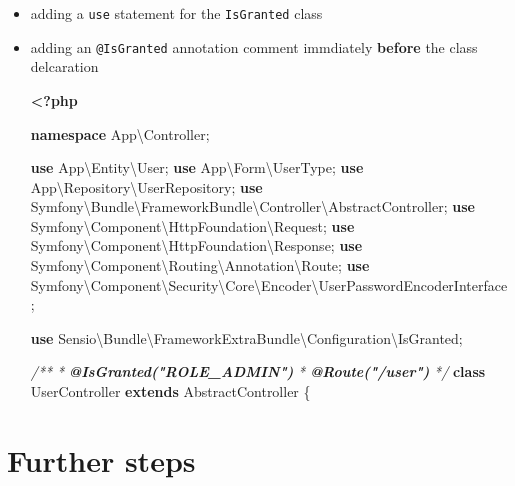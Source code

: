 \documentclass[a4paperpaper,openright]{book}
\newenvironment{Shaded}{}{}
\newcommand{\AnnotationTok}[1]{\textcolor[rgb]{0.38,0.63,0.69}{\textbf{\textit{#1}}}}
\newcommand{\CommentTok}[1]{\textcolor[rgb]{0.38,0.63,0.69}{\textit{#1}}}
\newcommand{\KeywordTok}[1]{\textcolor[rgb]{0.00,0.44,0.13}{\textbf{#1}}}
\newcommand{\NormalTok}[1]{#1}
\newcommand{\OtherTok}[1]{\textcolor[rgb]{0.00,0.44,0.13}{#1}}
\begin{document}
\begin{itemize}
\item
  adding a \texttt{use} statement for the \texttt{IsGranted} class
\item
  adding an \texttt{@IsGranted} annotation comment immdiately
  \textbf{before} the class delcaration

\begin{Shaded}
\begin{Highlighting}[]
\KeywordTok{<?php}

\KeywordTok{namespace}\NormalTok{ App\textbackslash{}Controller}\OtherTok{;}

\KeywordTok{use}\NormalTok{ App\textbackslash{}Entity\textbackslash{}User}\OtherTok{;}
\KeywordTok{use}\NormalTok{ App\textbackslash{}Form\textbackslash{}UserType}\OtherTok{;}
\KeywordTok{use}\NormalTok{ App\textbackslash{}Repository\textbackslash{}UserRepository}\OtherTok{;}
\KeywordTok{use}\NormalTok{ Symfony\textbackslash{}Bundle\textbackslash{}FrameworkBundle\textbackslash{}Controller\textbackslash{}AbstractController}\OtherTok{;}
\KeywordTok{use}\NormalTok{ Symfony\textbackslash{}Component\textbackslash{}HttpFoundation\textbackslash{}Request}\OtherTok{;}
\KeywordTok{use}\NormalTok{ Symfony\textbackslash{}Component\textbackslash{}HttpFoundation\textbackslash{}Response}\OtherTok{;}
\KeywordTok{use}\NormalTok{ Symfony\textbackslash{}Component\textbackslash{}Routing\textbackslash{}Annotation\textbackslash{}Route}\OtherTok{;}
\KeywordTok{use}\NormalTok{ Symfony\textbackslash{}Component\textbackslash{}Security\textbackslash{}Core\textbackslash{}Encoder\textbackslash{}UserPasswordEncoderInterface}\OtherTok{;}

\KeywordTok{use}\NormalTok{ Sensio\textbackslash{}Bundle\textbackslash{}FrameworkExtraBundle\textbackslash{}Configuration\textbackslash{}IsGranted}\OtherTok{;}


\CommentTok{/**}
\CommentTok{ * }\AnnotationTok{@IsGranted("ROLE_ADMIN")}
\CommentTok{ * }\AnnotationTok{@Route("/user")}
\CommentTok{ */}
\KeywordTok{class}\NormalTok{ UserController }\KeywordTok{extends}\NormalTok{ AbstractController}
\NormalTok{\{}
\end{Highlighting}
\end{Shaded}
\end{itemize}

\hypertarget{further-steps}{%
\section{Further steps}\label{further-steps}}
\end{document}
